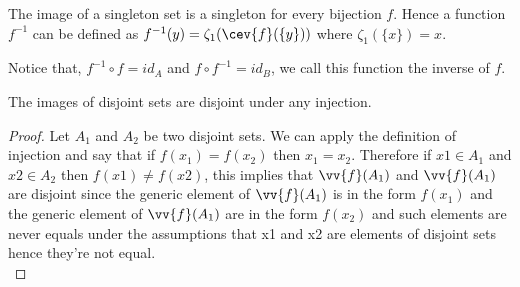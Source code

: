 \begin{lemma} 
\label{lem:inverseOfBijection}
    The image of a singleton set is a singleton for every bijection $f$. Hence 
    a function $f^{-1}$ can be defined as $f^{-1}(y) = \zeta_1(\cev{f}(\{y\}))$ where $\zeta_1(\{x\}) = x$.\\
\end{lemma}

Notice that, $f^{-1} \circ f = id_A$ and $f \circ f^{-1} = id_B$, we call this function 
the inverse of $f$.

\begin{lemma} 
    The images of disjoint sets are disjoint under any injection.
\end{lemma}
\begin{proof}
    Let $A_1$ and $A_2$ be two disjoint sets. We can apply the definition of injection and say that if $f(x_1) = f(x_2)$ 
    then $x_1 = x_2$. Therefore if $x1 \in A_1$ and $x2 \in A_2$ then $f(x1) \neq f(x2)$, this implies that 
    $\vv{f}(A_1)$ and $\vv{f}(A_1)$ are disjoint since the generic element of $\vv{f}(A_1)$ is in the form $f(x_1)$ and 
    the generic element of $\vv{f}(A_1)$ are in the form $f(x_2)$ and such elements are never equals under the assumptions that 
    x1 and x2 are elements of disjoint sets hence they're not equal. \\
\end{proof}

\newpage
